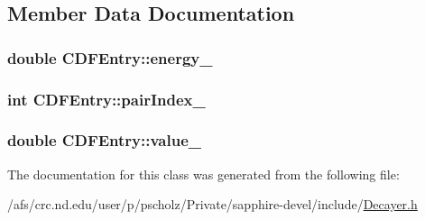 \subsection{Member Data Documentation}
\hypertarget{classCDFEntry_a38595cb908b213effa5551bc11cf33ba}{
\subsubsection[{energy\-\_\-}]{\setlength{\rightskip}{0pt plus 5cm}double C\-D\-F\-Entry\-::energy\-\_\-}}\label{classCDFEntry_a38595cb908b213effa5551bc11cf33ba}
\hypertarget{classCDFEntry_abc2b0634d678993cbaf8b1451b38fc29}{
\subsubsection[{pair\-Index\-\_\-}]{\setlength{\rightskip}{0pt plus 5cm}int C\-D\-F\-Entry\-::pair\-Index\-\_\-}}\label{classCDFEntry_abc2b0634d678993cbaf8b1451b38fc29}
\hypertarget{classCDFEntry_a4f5ef593ff6dad671b8eb92ec4c3c7f7}{
\subsubsection[{value\-\_\-}]{\setlength{\rightskip}{0pt plus 5cm}double C\-D\-F\-Entry\-::value\-\_\-}}\label{classCDFEntry_a4f5ef593ff6dad671b8eb92ec4c3c7f7}


The documentation for this class was generated from the following file\-:\begin{DoxyCompactItemize}
\item 
/afs/crc.\-nd.\-edu/user/p/pscholz/\-Private/sapphire-\/devel/include/\hyperlink{Decayer_8h}{Decayer.\-h}\end{DoxyCompactItemize}
